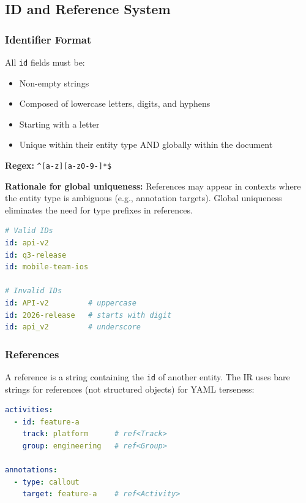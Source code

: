 \subsection{ID and Reference System}
\label{sec:ir-refs}

\subsubsection{Identifier Format}

All \texttt{id} fields must be:
\begin{itemize}
  \item Non-empty strings
  \item Composed of lowercase letters, digits, and hyphens
  \item Starting with a letter
  \item Unique within their entity type AND globally within the document
\end{itemize}

\textbf{Regex:} \verb|^[a-z][a-z0-9-]*$|

\textbf{Rationale for global uniqueness:} References may appear in contexts where the
entity type is ambiguous (e.g., annotation targets). Global uniqueness eliminates
the need for type prefixes in references.

\begin{lstlisting}[language=yaml,caption={ID examples}]
# Valid IDs
id: api-v2
id: q3-release
id: mobile-team-ios

# Invalid IDs
id: API-v2         # uppercase
id: 2026-release   # starts with digit
id: api_v2         # underscore
\end{lstlisting}

\subsubsection{References}

A reference is a string containing the \texttt{id} of another entity. The IR uses
bare strings for references (not structured objects) for YAML terseness:

\begin{lstlisting}[language=yaml]
activities:
  - id: feature-a
    track: platform      # ref<Track>
    group: engineering   # ref<Group>

annotations:
  - type: callout
    target: feature-a    # ref<Activity>
\end{lstlisting}

